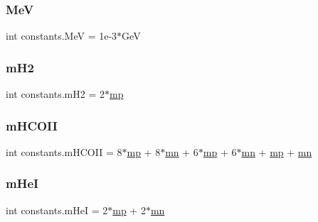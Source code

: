 \mbox{\label{namespaceconstants_a833162acb0cb16acebd5e3379bb4ab4d}} 
\subsubsection{\texorpdfstring{MeV}{MeV}}
{\footnotesize\ttfamily int constants.\+MeV = 1e-\/3$\ast$\+GeV}

\mbox{\label{namespaceconstants_a6286571f2bce388e5cba5df404f6a605}} 
\subsubsection{\texorpdfstring{m\+H2}{mH2}}
{\footnotesize\ttfamily int constants.\+m\+H2 = 2$\ast$\hyperlink{namespaceconstants_aebdc70445dfb9e72960792ba2efe97ab}{mp}}

\mbox{\label{namespaceconstants_a649f0308f09cf86c9658ebbddab3a4ce}} 
\subsubsection{\texorpdfstring{m\+H\+C\+O\+II}{mHCOII}}
{\footnotesize\ttfamily int constants.\+m\+H\+C\+O\+II = 8$\ast$\hyperlink{namespaceconstants_aebdc70445dfb9e72960792ba2efe97ab}{mp} + 8$\ast$\hyperlink{namespaceconstants_ad53f198771c37114065171d857217e26}{mn} + 6$\ast$\hyperlink{namespaceconstants_aebdc70445dfb9e72960792ba2efe97ab}{mp} + 6$\ast$\hyperlink{namespaceconstants_ad53f198771c37114065171d857217e26}{mn} + \hyperlink{namespaceconstants_aebdc70445dfb9e72960792ba2efe97ab}{mp} + \hyperlink{namespaceconstants_ad53f198771c37114065171d857217e26}{mn}}

\mbox{\label{namespaceconstants_af49326d192aac38eba034ab6650bf4da}} 
\subsubsection{\texorpdfstring{m\+HeI}{mHeI}}
{\footnotesize\ttfamily int constants.\+m\+HeI = 2$\ast$\hyperlink{namespaceconstants_aebdc70445dfb9e72960792ba2efe97ab}{mp} + 2$\ast$\hyperlink{namespaceconstants_ad53f198771c37114065171d857217e26}{mn}}

